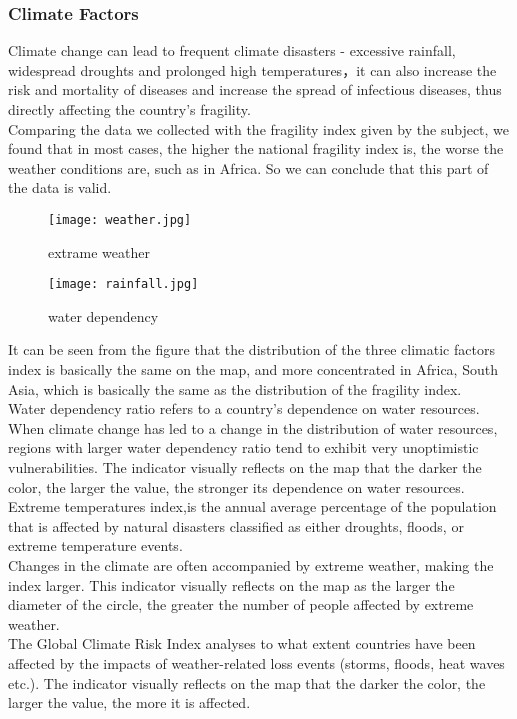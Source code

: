 \documentclass{mcmthesis}
\begin{document}
\subsubsection{Climate Factors}
Climate change can lead to frequent climate disasters - excessive rainfall, widespread droughts and prolonged high temperatures，it can also increase the risk and mortality of diseases and increase the spread of infectious diseases, thus directly affecting the country's fragility.\\
Comparing the data we collected with the fragility index given by the subject, we found that in most cases, the higher the national fragility index is, the worse the weather conditions are, such as in Africa. So we can conclude that this part of the data is valid.\\
\begin{figure}[h]
  \centering
  \begin{minipage}[h]{0.48\textwidth}
  \centering
  \texttt{[image: weather.jpg]}
  \caption{extrame weather}
  \end{minipage}
  \begin{minipage}[h]{0.48\textwidth}
  \centering
  \texttt{[image: rainfall.jpg]}
  \caption{water dependency}
  \end{minipage}
\end{figure}
It can be seen from the figure that the distribution of the three climatic factors index is basically the same on the map, and more concentrated in Africa, South Asia, which is basically the same as the distribution of the fragility index.\\
Water dependency ratio refers to a country's dependence on water resources. When climate change has led to a change in the distribution of water resources, regions with larger water dependency ratio tend to exhibit very unoptimistic vulnerabilities. The indicator visually reflects on the map that the darker the color, the larger the value, the stronger its dependence on water resources.\\
Extreme temperatures index,is the annual average percentage of the population that is affected by natural disasters classified as either droughts, floods, or extreme temperature events. \\
Changes in the climate are often accompanied by extreme weather, making the index larger. This indicator visually reflects on the map as the larger the diameter of the circle, the greater the number of people affected by extreme weather.\\
The Global Climate Risk Index analyses to what extent countries have been affected by the impacts of weather-related loss events (storms, floods, heat waves etc.).
The indicator visually reflects on the map that the darker the color, the larger the value, the more it is affected.
\end{document}
